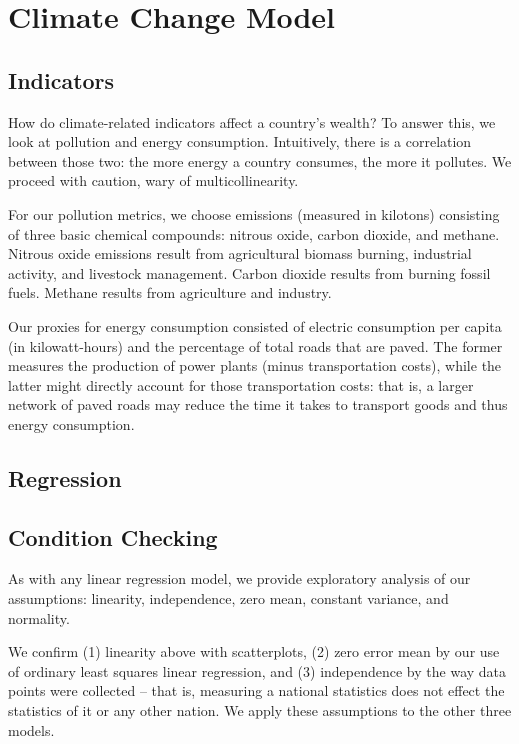 \documentclass[12pt]{article}
\begin{document}
\section{Climate Change Model}

\subsection{Indicators}
How do climate-related indicators affect a country's wealth? To answer this, we look at pollution and energy consumption. Intuitively, there is a correlation between those two: the more energy a country consumes, the more it pollutes. We proceed with caution, wary of multicollinearity.

For our pollution metrics, we choose emissions (measured in kilotons) consisting of three basic chemical compounds: nitrous oxide, carbon dioxide, and methane. Nitrous oxide emissions result from agricultural biomass burning, industrial activity, and livestock management. Carbon dioxide results from burning fossil fuels. Methane results from agriculture and industry.

Our proxies for energy consumption consisted of electric consumption per capita (in kilowatt-hours) and the percentage of total roads that are paved. The former measures the production of power plants (minus transportation costs), while the latter might directly account for those transportation costs: that is, a larger network of paved roads may reduce the time it takes to transport goods and thus energy consumption.


\subsection{Regression}

\subsection{Condition Checking}
As with any linear regression model, we provide exploratory analysis of our assumptions: linearity, independence, zero mean, constant variance, and normality.

We confirm (1) linearity above with scatterplots, (2) zero error mean by our use of ordinary least squares linear regression, and (3) independence by the way data points were collected -- that is, measuring a national statistics does not effect the statistics of it or any other nation. We apply these assumptions to the other three models.
\end{document}
